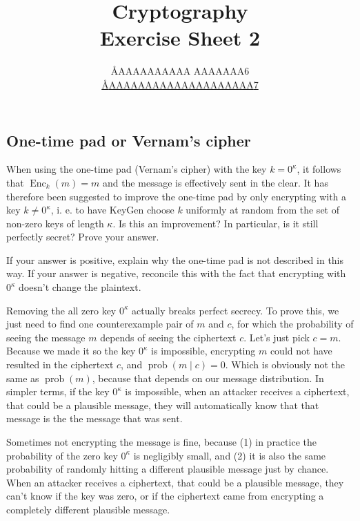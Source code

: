 \documentclass{article}
\title{Cryptography \\ Exercise Sheet 2}
\author{
  \AA{AAAAAAAAAA AAAAAAA}{6} \\
  \href{mailto:\AA{AAAAAAAAAAAAAAAAAAAA}{7}}{\AA{AAAAAAAAAAAAAAAAAAAA}{7}}
}
\begin{document}
  \maketitle

  \setcounter{section}{2}
  \subsection{One-time pad or Vernam's cipher}
  \begin{centerframebox}
    When using the one-time pad (Vernam's cipher) with the key $k = 0^\kappa$, it
    follows that $\operatorname{Enc}_k(m) = m$ and the message is effectively sent in the clear.
    It has therefore been suggested to improve the one-time pad by only encrypting with a key $k \neq 0^\kappa$,
    i. e. to have KeyGen choose $k$ uniformly at random from the set of non-zero keys of length $\kappa$.
    Is this an improvement? In particular, is it still perfectly secret? Prove your answer.

    If your answer is positive, explain why the one-time pad is not described
    in this way. If your answer is negative, reconcile this with the fact that
    encrypting with $0^\kappa$ doesn't change the plaintext.
  \end{centerframebox}
  Removing the all zero key $0^\kappa$ actually breaks perfect secrecy.
  To prove this, we just need to find one counterexample pair of $m$ and $c$,
  for which the probability of seeing the message $m$ depends of seeing the ciphertext $c$.
  Let's just pick $c = m$.
  Because we made it so the key $0^\kappa$ is impossible,
  encrypting $m$ could not have resulted in the ciphertext $c$, and $\operatorname{prob}(m \mid c) = 0$.
  Which is obviously not the same as $\operatorname{prob}(m)$, because that depends on our message distribution.
  In simpler terms, if the key $0^\kappa$ is impossible, when an attacker receives a ciphertext, that could be a plausible message,
  they will automatically know that that message is the the message that was sent.

  Sometimes not encrypting the message is fine, because
  (1) in practice the probability of the zero key $0^\kappa$ is negligibly small, and
  (2) it is also the same probability of randomly hitting a different plausible message just by chance.
  When an attacker receives a ciphertext, that could be a plausible message, they can't know if the key was zero,
  or if the ciphertext came from encrypting a completely different plausible message.
\end{document}
